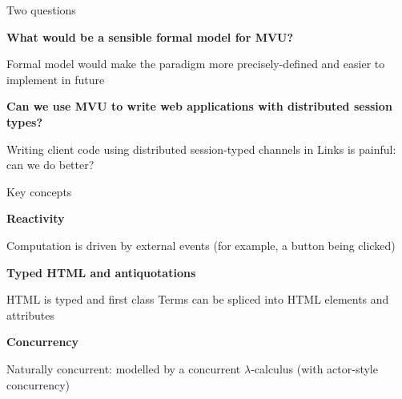 \documentclass[11.5pt, aspectratio=169]{beamer}
\begin{document}
\begin{frame}{Two questions}
  \begin{fullpageitemize}
  \item {\Large \textbf{What would be a sensible formal model for MVU?}}
    \begin{itemize}
      \itemR Formal model would make the paradigm more precisely-defined and easier to implement in future
    \end{itemize}
    \vspace{1em}
  \item {\Large \textbf{Can we use MVU to write web applications with distributed session types?}}
    \begin{itemize}
      \itemR Writing client code using distributed session-typed channels in Links is painful: can we do better?
    \end{itemize}
  \end{fullpageitemize}
\end{frame}


\begin{frame}{Key concepts}

  \begin{fullpageitemize}
  \item {\Large \textbf{Reactivity}}
    \begin{itemize}
      \itemR Computation is driven by external events (for example, a button being clicked)
    \end{itemize}
    \vspace{0.5em}
  \item {\Large \textbf{Typed HTML and antiquotations}}
    \begin{itemize}
      \itemR HTML is typed and first class
      \itemR Terms can be spliced into HTML elements and attributes
    \end{itemize}
    \vspace{0.5em}
  \item {\Large \textbf{Concurrency}}
    \begin{itemize}
      \itemR Naturally concurrent: modelled by a concurrent $\lambda$-calculus (with actor-style concurrency)
    \end{itemize}
  \end{fullpageitemize}
\end{frame}
\end{document}
